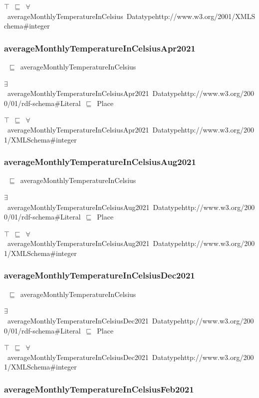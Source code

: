 \documentclass{article}
\begin{document}
\ensuremath{\top}~\ensuremath{\sqsubseteq}~\ensuremath{\forall}~averageMonthlyTemperatureInCelsius~Datatypehttp://www.w3.org/2001/XMLSchema#integer

\subsubsection*{averageMonthlyTemperatureInCelsiusApr2021}

~\ensuremath{\sqsubseteq}~averageMonthlyTemperatureInCelsius

\ensuremath{\exists}~averageMonthlyTemperatureInCelsiusApr2021~Datatypehttp://www.w3.org/2000/01/rdf-schema#Literal~\ensuremath{\sqsubseteq}~Place

\ensuremath{\top}~\ensuremath{\sqsubseteq}~\ensuremath{\forall}~averageMonthlyTemperatureInCelsiusApr2021~Datatypehttp://www.w3.org/2001/XMLSchema#integer

\subsubsection*{averageMonthlyTemperatureInCelsiusAug2021}

~\ensuremath{\sqsubseteq}~averageMonthlyTemperatureInCelsius

\ensuremath{\exists}~averageMonthlyTemperatureInCelsiusAug2021~Datatypehttp://www.w3.org/2000/01/rdf-schema#Literal~\ensuremath{\sqsubseteq}~Place

\ensuremath{\top}~\ensuremath{\sqsubseteq}~\ensuremath{\forall}~averageMonthlyTemperatureInCelsiusAug2021~Datatypehttp://www.w3.org/2001/XMLSchema#integer

\subsubsection*{averageMonthlyTemperatureInCelsiusDec2021}

~\ensuremath{\sqsubseteq}~averageMonthlyTemperatureInCelsius

\ensuremath{\exists}~averageMonthlyTemperatureInCelsiusDec2021~Datatypehttp://www.w3.org/2000/01/rdf-schema#Literal~\ensuremath{\sqsubseteq}~Place

\ensuremath{\top}~\ensuremath{\sqsubseteq}~\ensuremath{\forall}~averageMonthlyTemperatureInCelsiusDec2021~Datatypehttp://www.w3.org/2001/XMLSchema#integer

\subsubsection*{averageMonthlyTemperatureInCelsiusFeb2021}
\end{document}
